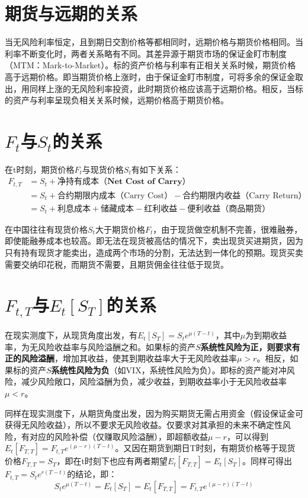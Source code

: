 \documentclass[11pt]{article}
\begin{document}
\section{期货与远期的关系}
当无风险利率恒定，且到期日交割价格等都相同时，远期价格与期货价格相同。当利率不断变化时，两者关系略有不同。其差异源于期货市场的保证金盯市制度（MTM：Mark-to-Market）。标的资产价格与利率有正相关关系时候，期货价格高于远期价格。即当期货价格上涨时，由于保证金盯市制度，可将多余的保证金取出，用同样上涨的无风险利率投资，此时期货价格应该高于远期价格。相反，当标的资产与利率呈现负相关关系时候，远期价格高于期货价格。

\section{$F_t$与$S_t$的关系}
在t时刻，期货价格$F_t$与现货价格$S_t$有如下关系：
\begin{align*}
    F_{t,T} &= S_t + \textbf{净持有成本（Net Cost of Carry）} \\
    &= S_t + \text{合约期限内成本（Carry Cost）} - \text{合约期限内收益（Carry Return）} \\
    &= S_t + \text{利息成本} + \text{储藏成本} - \text{红利收益} - \text{便利收益（商品期货）}
\end{align*}

在中国往往有现货价格$S_t$大于期货价格$F_t$，由于现货做空机制不完善，很难融券，即使能融券成本也较高。即无法在现货被高估的情况下，卖出现货买进期货，因为只有持有现货才能卖出，造成两个市场的分割，无法达到一体化的预期。现货买卖需要交纳印花税，而期货不需要，且期货佣金往往低于现货。

\section{$F_{t,T}$与$E_t[S_T]$的关系}

在现实测度下，从现货角度出发，有$E_t[S_T]=S_t e^{\mu(T-t)}$，其中$\mu$为到期收益率，为无风险收益率与风险溢酬之和。如果标的资产$S$\textbf{系统性风险为正，则要求有正的风险溢酬}，增加其收益，使其到期收益率大于无风险收益率$\mu>r$。相反，如果标的资产$S$\textbf{系统性风险为负}（如VIX，系统性风险为负）。即标的资产能对冲风险，减少风险敞口，风险溢酬为负，减少收益，到期收益率小于无风险收益率$\mu<r$。

同样在现实测度下，从期货角度出发，因为购买期货无需占用资金（假设保证金可获得无风险收益），所以不要求无风险收益。仅要求对其承担的未来不确定性风险，有对应的风险补偿（仅赚取风险溢酬），即超额收益$\mu-r$，可以得到$E_t[F_{T,T}] = F_{t,T} e^{(\mu-r)(T-t)}$。又因在期货到期日T时刻，有期货价格等于现货价格$F_{T,T} = S_T$，即在t时刻下也应有两者期望$E_t[F_{T,T}] = E_t[S_T]$。同样可得出$F_{t,T} = S_t e^{r(T-t)}$的结论，即：
\begin{equation*}
    S_t e^{\mu(T-t)} = E_t[S_T] = E_t[F_{T,T}] = F_{t,T} e^{(\mu-r)(T-t)}
\end{equation*}
\end{document}
